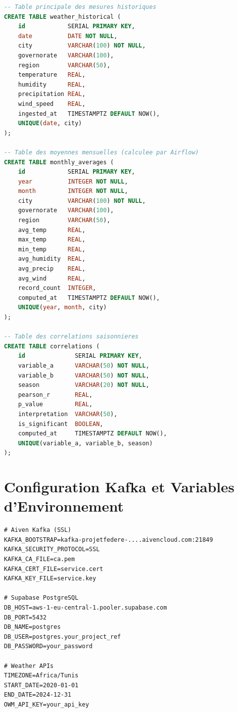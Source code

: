 \documentclass[a4paper,12pt,oneside]{report}
\begin{document}
\begin{lstlisting}[language=SQL,caption={Extrait du schéma de la base de données Supabase}]
-- Table principale des mesures historiques
CREATE TABLE weather_historical (
    id            SERIAL PRIMARY KEY,
    date          DATE NOT NULL,
    city          VARCHAR(100) NOT NULL,
    governorate   VARCHAR(100),
    region        VARCHAR(50),
    temperature   REAL,
    humidity      REAL,
    precipitation REAL,
    wind_speed    REAL,
    ingested_at   TIMESTAMPTZ DEFAULT NOW(),
    UNIQUE(date, city)
);

-- Table des moyennes mensuelles (calculee par Airflow)
CREATE TABLE monthly_averages (
    id            SERIAL PRIMARY KEY,
    year          INTEGER NOT NULL,
    month         INTEGER NOT NULL,
    city          VARCHAR(100) NOT NULL,
    governorate   VARCHAR(100),
    region        VARCHAR(50),
    avg_temp      REAL,
    max_temp      REAL,
    min_temp      REAL,
    avg_humidity  REAL,
    avg_precip    REAL,
    avg_wind      REAL,
    record_count  INTEGER,
    computed_at   TIMESTAMPTZ DEFAULT NOW(),
    UNIQUE(year, month, city)
);

-- Table des correlations saisonnieres
CREATE TABLE correlations (
    id              SERIAL PRIMARY KEY,
    variable_a      VARCHAR(50) NOT NULL,
    variable_b      VARCHAR(50) NOT NULL,
    season          VARCHAR(20) NOT NULL,
    pearson_r       REAL,
    p_value         REAL,
    interpretation  VARCHAR(50),
    is_significant  BOOLEAN,
    computed_at     TIMESTAMPTZ DEFAULT NOW(),
    UNIQUE(variable_a, variable_b, season)
);
\end{lstlisting}

\chapter{Configuration Kafka et Variables d'Environnement}
\label{app:config}

\begin{lstlisting}[caption={Fichier .env.example}]
# Aiven Kafka (SSL)
KAFKA_BOOTSTRAP=kafka-projetfedere-....aivencloud.com:21849
KAFKA_SECURITY_PROTOCOL=SSL
KAFKA_CA_FILE=ca.pem
KAFKA_CERT_FILE=service.cert
KAFKA_KEY_FILE=service.key

# Supabase PostgreSQL
DB_HOST=aws-1-eu-central-1.pooler.supabase.com
DB_PORT=5432
DB_NAME=postgres
DB_USER=postgres.your_project_ref
DB_PASSWORD=your_password

# Weather APIs
TIMEZONE=Africa/Tunis
START_DATE=2020-01-01
END_DATE=2024-12-31
OWM_API_KEY=your_api_key
\end{lstlisting}
\end{document}
